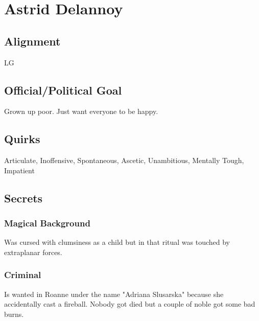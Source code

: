 \section*{Astrid Delannoy}

\subsection*{Alignment}
LG

\subsection*{Official/Political Goal}
Grown up poor. Just want everyone to be happy.

\subsection*{Quirks}
Articulate, Inoffensive, Spontaneous, Ascetic, Unambitious, Mentally Tough, Impatient

\subsection*{Secrets}
\subsubsection*{Magical Background}
Was cursed with clumsiness as a child but in that ritual was touched by extraplanar forces.

\subsubsection*{Criminal}
Is wanted in Roanne under the name "Adriana Slusarska" because she accidentally cast a fireball. Nobody got died but a couple of noble got some bad burns. 